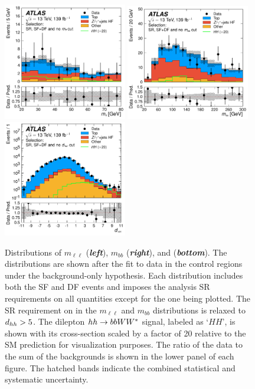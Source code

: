 \begin{figure}[!htb]
    \begin{center}
        \includegraphics[width=0.48\textwidth]{figures/search_hh/results/sr_plots/srIncNoMllDhh_mll}
        \includegraphics[width=0.48\textwidth]{figures/search_hh/results/sr_plots/srIncNoMbbDhh_mbb}
        \includegraphics[width=0.48\textwidth]{figures/search_hh/results/sr_plots/srIncNoDhh_NN_d_hh}
        \caption{
            Distributions of $m_{\ell \ell}$ (\textit{\textbf{left}}), $m_{bb}$ (\textit{\textbf{right}}),
            and \dhh (\textit{\textbf{bottom}}).
            The distributions are shown after the fit to data in the control regions under the background-only hypothesis.
            Each distribution includes both the SF and DF events and imposes the analysis SR requirements
            on all quantities except for the one being plotted.
            The SR requirement on \dhh in the $m_{\ell\ell}$ and $m_{bb}$ distributions is relaxed to $ d_{hh} > 5$.
            The dilepton $hh \rightarrow bbWW^*$ signal, labeled as `$HH$', is shown with its cross-section scaled
            by a factor of 20 relative to the SM prediction for visualization purposes.
            The ratio of the data to the sum of the backgrounds is shown in the lower panel of each figure.
            The hatched bands indicate the combined statistical and systematic uncertainty.
        }
        \label{fig:hh_sr_kin_0}
    \end{center}
\end{figure}

